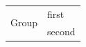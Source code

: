 \begin{tabular}{ll}
\toprule
\multirow{2}{*}{Group} & first \\
& second \\
\bottomrule
\end{tabular}
